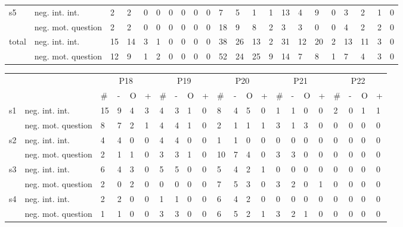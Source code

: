 \begin{table*}[h]
\begin{small}
\begin{tabular*}{\hsize}{@{\extracolsep{\fill}}llllllllllllllllllllll}
      \multirow{2}{*}{s5} & neg. int. int. & 2 & 2 & 0 & 0 & 0 & 0 & 0 & 0 & 7 & 5 & 1 & 1 & 13 & 4 & 9 & 0 & 3 & 2 & 1 & 0\\
      & neg. mot. question & 2 & 2 & 0 & 0 & 0 & 0 & 0 & 0 & 18 & 9 & 8 & 2 & 3 & 3 & 0 & 0 & 4 & 2 & 2 & 0\\
      \multirow{2}{*}{total} & neg. int. int. & 15 & 14 & 3 & 1 & 0 & 0 & 0 & 0 & 38 & 26 & 13 & 2 & 31 & 12 & 20 & 2 & 13 & 11 & 3 & 0\\
      & neg. mot. question & 12 & 9 & 1 & 2 & 0 & 0 & 0 & 0 & 52 & 24 & 25 & 9 & 14 & 7 & 8 & 1 & 7 & 4 & 3 & 0\\
    \end{tabular*}
    \setlength{\tabcolsep}{1.1ex}
    \begin{tabular*}{\hsize}{@{\extracolsep{\fill}}llllllllllllllllllllll}
      \toprule
      &  & \multicolumn{4}{c}{P18} & \multicolumn{4}{c}{P19} & \multicolumn{4}{c}{P20} & \multicolumn{4}{c}{P21} & \multicolumn{4}{c}{P22}\\
      \cmidrule(lr){3-6}\cmidrule(lr){7-10}\cmidrule(lr){11-14}\cmidrule(lr){15-18}\cmidrule(lr){19-22}
      &  & \# & - & O & + & \# & - & O & + & \# & - & O & + & \# & - & O & + & \# & - & O & +\\
      \cmidrule(lr){3-6}\cmidrule(lr){7-10}\cmidrule(lr){11-14}\cmidrule(lr){15-18}\cmidrule(lr){19-22}
      \multirow{2}{*}{s1} & neg. int. int. & 15 & 9 & 4 & 3 & 4 & 3 & 1 & 0 & 8 & 4 & 5 & 0 & 1 & 1 & 0 & 0 & 2 & 0 & 1 & 1\\
      & neg. mot. question & 8 & 7 & 2 & 1 & 4 & 4 & 1 & 0 & 2 & 1 & 1 & 1 & 3 & 1 & 3 & 0 & 0 & 0 & 0 & 0\\
      \multirow{2}{*}{s2} & neg. int. int. & 4 & 4 & 0 & 0 & 4 & 4 & 0 & 0 & 1 & 1 & 0 & 0 & 0 & 0 & 0 & 0 & 0 & 0 & 0 & 0\\
      & neg. mot. question & 2 & 1 & 1 & 0 & 3 & 3 & 1 & 0 & 10 & 7 & 4 & 0 & 3 & 3 & 0 & 0 & 0 & 0 & 0 & 0\\
      \multirow{2}{*}{s3} & neg. int. int. & 6 & 4 & 3 & 0 & 5 & 5 & 0 & 0 & 5 & 4 & 2 & 1 & 0 & 0 & 0 & 0 & 0 & 0 & 0 & 0\\
      & neg. mot. question & 2 & 0 & 2 & 0 & 0 & 0 & 0 & 0 & 7 & 5 & 3 & 0 & 3 & 2 & 0 & 1 & 0 & 0 & 0 & 0\\
      \multirow{2}{*}{s4} & neg. int. int. & 2 & 2 & 0 & 0 & 1 & 1 & 0 & 0 & 6 & 4 & 2 & 0 & 0 & 0 & 0 & 0 & 0 & 0 & 0 & 0\\
      & neg. mot. question & 1 & 1 & 0 & 0 & 3 & 3 & 0 & 0 & 6 & 5 & 2 & 1 & 3 & 2 & 1 & 0 & 0 & 0 & 0 & 0\\

\end{tabular*}
\end{small}
\end{table*}
